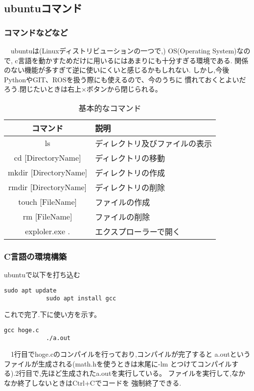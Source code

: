 \documentclass[dvipdfmx]{beamer}
\begin{document}
\subsection{ubuntuコマンド}
\begin{frame}[t, fragile, label=6]
    \frametitle{コマンドなどなど}
    　ubuntuは(Linuxディストリビューションの一つで,)
    OS(Operating System)なので,
    c言語を動かすためだけに用いるにはあまりにも十分すぎる環境である.
    関係のない機能が多すぎて逆に使いにくいと感じるかもしれない.
    しかし,今後PythonやGIT、ROSを扱う際にも使えるので、今のうちに
    慣れておくとよいだろう.閉じたいときは右上×ボタンから閉じられる。
    \begin{table}[h]
        \caption{基本的なコマンド}
        \label{commands}
        \centering
        \begin{tabular}{cl}
            \hline
            コマンド & 説明\\               
            \hline \hline
            ls & ディレクトリ及びファイルの表示\\
            cd [DirectoryName] & ディレクトリの移動\\
            mkdir [DirectoryName] & ディレクトリの作成\\
            rmdir [DirectoryName] & ディレクトリの削除\\
            touch [FileName] & ファイルの作成\\
            rm [FileName] & ファイルの削除\\
            exploler.exe . & エクスプローラーで開く\\
            \hline
        \end{tabular}
    \end{table}
    \vfill \hfill 
    \hyperlink{5}{}
    \space
    \hyperlink{7}{}
\end{frame}

\begin{frame}[t, fragile, label=7]
    \frametitle{C言語の環境構築}
    ubuntuで以下を打ち込む
        \begin{lstlisting}[gobble=9, caption=ubuntu, label=c_setup]
            sudo apt update
            sudo apt install gcc
        \end{lstlisting}
    これで完了.下に使い方を示す。
        \begin{lstlisting}[gobble=9, caption=ubuntu, label=c_howto]
            gcc hoge.c
            ./a.out
        \end{lstlisting}
    　1行目でhoge.cのコンパイルを行っており,コンパイルが完了すると
    a.outというファイルが生成される(math.hを使うときは末尾に-lm
    とつけてコンパイルする).2行目で,先ほど生成されたa.outを実行している。
    ファイルを実行して,なかなか終了しないときはCtrl+Cでコードを
    強制終了できる.
    \vfill \hfill 
    \hyperlink{6}{}
    \space
    \hyperlink{8}{}
\end{frame}
\end{document}
